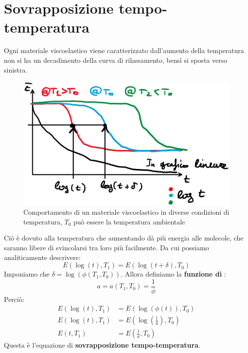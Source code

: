 \chapter{Sovrapposizione tempo-temperatura}\label{chp:SovrapposizioneTT}
Ogni materiale viscoelastico viene caratterizzato dall'aumento della temperatura non si ha un decadimento della curva di rilassamento, bensì si sposta verso sinistra.

\begin{figure}
\centering
\includegraphics[width = \textwidth]{gfx/SovrapposizioneTT}
\caption{Comportamento di un materiale viscoelastico in diverse condizioni di temperatura, $T_0$ può essere la temperatura ambientale}
\label{fig:SovrapposizioneTT}
\end{figure}

Ciò è dovuto alla temperatura che aumentando dà più energia alle molecole, che saranno libere di svincolarsi tra loro più facilmente.
Da cui possiamo analiticamente descrivere:
\begin{equation}
E(\log(t),T_1) = E(\log(t+\delta), T_0)
\end{equation}
Imponiamo che $\delta = \log(\phi(T_1,T_0))$.
Allora definiamo la \textbf{funzione di }:
\begin{equation}
a = a(T_1,T_0) = \frac{1}{\phi}
\end{equation}
Perciò:
\begin{equation}
\begin{split}
E(\log(t),T_1) &= E(\log(\phi(t)),T_0)\\
E(\log(t),T_1) &= E(\log(\frac{t}{a}),T_0)\\
E(t,T_1) &= E(\frac{t}{a},T_0)
\end{split}
\end{equation}
Questa è l'equazione di \textbf{sovrapposizione tempo-temperatura}.

